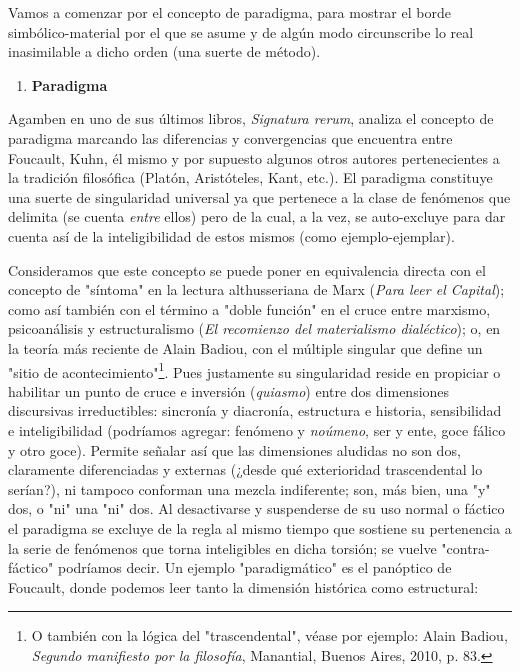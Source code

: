 \documentclass{book}
\begin{document}
Vamos a comenzar por el concepto de paradigma, para mostrar el borde
simbólico-material por el que se asume y de algún modo circunscribe lo
real inasimilable a dicho orden (una suerte de método).

\begin{enumerate}
\def\labelenumi{\arabic{enumi}.}
\item
  \textbf{Paradigma}
\end{enumerate}

Agamben en uno de sus últimos libros, \emph{Signatura rerum}, analiza el
concepto de paradigma marcando las diferencias y convergencias que
encuentra entre Foucault, Kuhn, él mismo y por supuesto algunos otros
autores pertenecientes a la tradición filosófica (Platón, Aristóteles,
Kant, etc.). El paradigma constituye una suerte de singularidad
universal ya que pertenece a la clase de fenómenos que delimita (se
cuenta \emph{entre} ellos) pero de la cual, a la vez, se auto-excluye
para dar cuenta así de la inteligibilidad de estos mismos (como
ejemplo-ejemplar).

Consideramos que este concepto se puede poner en equivalencia directa
con el concepto de "síntoma" en la lectura althusseriana de Marx
(\emph{Para leer el Capital}); como así también con el término a "doble
función" en el cruce entre marxismo, psicoanálisis y estructuralismo
(\emph{El recomienzo del materialismo dialéctico}); o, en la teoría más
reciente de Alain Badiou, con el múltiple singular que define un "sitio
de acontecimiento"\footnote{O también con la lógica del "trascendental",
  véase por ejemplo: Alain Badiou, \emph{Segundo manifiesto por la
  filosofía}, Manantial, Buenos Aires, 2010, p. 83.}. Pues justamente su
singularidad reside en propiciar o habilitar un punto de cruce e
inversión (\emph{quiasmo}) entre dos dimensiones discursivas
irreductibles: sincronía y diacronía, estructura e historia,
sensibilidad e inteligibilidad (podríamos agregar: fenómeno y
\emph{noúmeno}, ser y ente, goce fálico y otro goce). Permite señalar
así que las dimensiones aludidas no son dos, claramente diferenciadas y
externas (¿desde qué exterioridad trascendental lo serían?), ni tampoco
conforman una mezcla indiferente; son, más bien, una "y" dos, o "ni" una
"ni" dos. Al desactivarse y suspenderse de su uso normal o fáctico el
paradigma se excluye de la regla al mismo tiempo que sostiene su
pertenencia a la serie de fenómenos que torna inteligibles en dicha
torsión; se vuelve "contra-fáctico" podríamos decir. Un ejemplo
"paradigmático" es el panóptico de Foucault, donde podemos leer tanto la
dimensión histórica como estructural:
\end{document}
